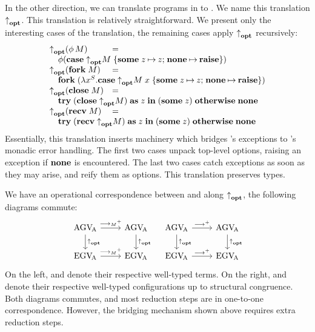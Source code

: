 \documentclass[sigplan,review,anonymous]{acmart}
\begin{document}
In the other direction, we can translate programs in \affineAGV to \affineEGV. We name this translation $\relax{{\uparrow}_{\mathbf{opt}}}\relax{}$. This translation is relatively straightforward. We present only the interesting cases of the translation, the remaining cases apply $\relax{{\uparrow}_{\mathbf{opt}}}\relax{}$ recursively:
\[
  \begin{array}{lcl}
    \mta{\parens{\rvThread{\phi}{M}}}
    & = &
    \\
    \multicolumn{3}{l}{%
    \quad\gvThread{\phi}{\parens{\gvCaseOpt{\mta{M}}{z}{z}{\gvRaise}}}}
    \\
    \mta{\parens{\gvFork{M}}}
    & = &
    \\
    \multicolumn{3}{l}{%
    \quad\gvFork{\parens{\gvAbs[S]{x}{\gvCaseOpt{\gvApp{\mta{M}}{x}}{z}{z}{\gvRaise}}}}}
    \\
    \mta{\parens{\gvClose{M}}}
    & = &
    \\
    \multicolumn{3}{l}{%
    \quad\gvTry{\parens{\gvClose{\mta{M}}}}{z}{\parens{\gvSome{z}}}{\gvNone}}
    \\
    \mta{\parens{\gvRecv{M}}}
    & = &
    \\
    \multicolumn{3}{l}{%
    \quad\gvTry{\parens{\gvRecv{\mta{M}}}}{z}{\parens{\gvSome{z}}}{\gvNone}}
  \end{array}
\]
Essentially, this translation inserts machinery which bridges \affineEGV's exceptions to \affineAGV's monadic error handling. The first two cases unpack top-level options, raising an exception if $\relax{\mathbf{none}}$ is encountered. The last two cases catch exceptions as soon as they may arise, and reify them as options.
This translation preserves types.

We have an operational correspondence between \affineAGV and \affineEGV along $\relax{{\uparrow}_{\mathbf{opt}}}\relax{}$, \ie the following diagrams commute:
\[
  \begin{tikzcd}
    \affineAGV
    \rar{\gvRedArrPure^+}
    \dar{\mta{}}
    &
    \affineAGV
    \dar{\mta{}}
    \\
    \affineEGV
    \rar{\gvRedArrPure^+}
    &
    \affineEGV
  \end{tikzcd}
  \quad
  \begin{tikzcd}
    \affineAGV
    \rar{\gvRedArr^+}
    \dar{\mta{}}
    &
    \affineAGV
    \dar{\mta{}}
    \\
    \affineEGV
    \rar{\gvRedArr^+}
    &
    \affineEGV
  \end{tikzcd}
\]
On the left, \affineAGV and \affineEGV denote their respective well-typed terms. On the right, \affineAGV and \affineEGV denote their respective well-typed configurations up to structural congruence. Both diagrams commutes, and most reduction steps are in one-to-one correspondence. However, the bridging mechanism shown above requires extra reduction steps.
\end{document}
